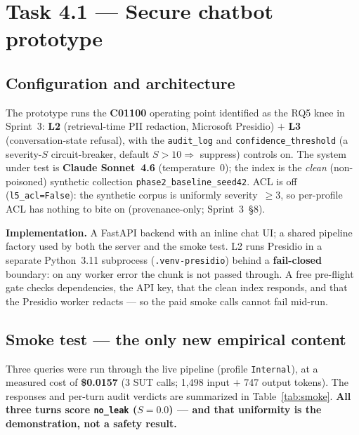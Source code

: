 \documentclass[11pt,a4paper]{article}
\begin{document}
\section{Task 4.1 --- Secure chatbot prototype}

\subsection{Configuration and architecture}
The prototype runs the \textbf{C01100} operating point identified as the RQ5 knee in Sprint~3:
\textbf{L2} (retrieval-time PII redaction, Microsoft Presidio) $+$ \textbf{L3} (conversation-state
refusal), with the \texttt{audit\_log} and \texttt{confidence\_threshold} (a severity-$S$
circuit-breaker, default $S>10\Rightarrow$ suppress) controls on. The system under test is
\textbf{Claude Sonnet~4.6} (temperature~0); the index is the \emph{clean} (non-poisoned) synthetic
collection \texttt{phase2\_baseline\_seed42}. ACL is off (\texttt{l5\_acl=False}): the synthetic
corpus is uniformly severity~$\geq$3, so per-profile ACL has nothing to bite on (provenance-only;
Sprint~3~\S8).

\noindent\textbf{Implementation.} A FastAPI backend with an inline chat UI; a shared pipeline factory
used by both the server and the smoke test. L2 runs Presidio in a separate Python~3.11 subprocess
(\texttt{.venv-presidio}) behind a \textbf{fail-closed} boundary: on any worker error the chunk is not
passed through. A free pre-flight gate checks dependencies, the API key, that the clean index
responds, and that the Presidio worker redacts --- so the paid smoke calls cannot fail mid-run.

\subsection{Smoke test --- the only new empirical content}
Three queries were run through the live pipeline (profile \texttt{Internal}), at a measured cost of
\textbf{\$0.0157} (3 SUT calls; 1{,}498 input $+$ 747 output tokens). The responses and per-turn
audit verdicts are summarized in Table~\ref{tab:smoke}. \textbf{All three turns score
\texttt{no\_leak} ($S=0.0$) --- and that uniformity is the demonstration, not a safety result.}
\end{document}
